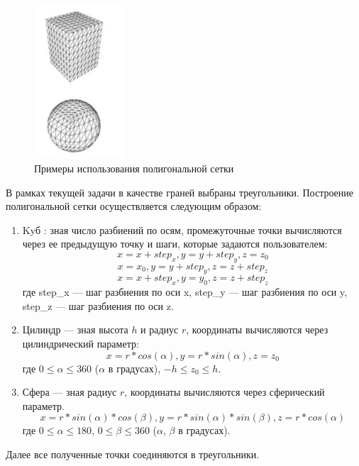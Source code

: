 \begin{figure}[h]
	\centering
	\includegraphics[width=0.3\textwidth]{img/polygon.png}
	\caption{Примеры использования полигональной сетки}
	\label{fig:polygon}
\end{figure}
\clearpage
В рамках текущей задачи в качестве граней выбраны треугольники.
Построение полигональной сетки осуществляется следующим образом:
\begin{enumerate}
	\item Kyб : зная число разбиений по осям, промежуточные точки вычисляются через ее предыдущую точку и шаги, которые задаются пользователем:
	\begin{equation}
		x = x + step_x, y = y + step_y, z = z_0
	\end{equation}
	\begin{equation}
		x = x_0, y = y + step_y, z = z + step_z
	\end{equation}
	\begin{equation}
		x = x + step_x, y = y_0, z = z + step_z
	\end{equation}
	где step\_x --- шаг разбиения по оси x, step\_y --- шаг разбиения по оси y, step\_z --- шаг разбиения по оси z.
	\item Цилиндр --- зная высота ${h}$ и радиус ${r}$, координаты вычисляются через цилиндрический параметр:
	\begin{equation}
		x = r * cos(\alpha), y = r * sin(\alpha), z = z_0
	\end{equation}
	где $0 \leqslant \alpha \leqslant 360$ ($\alpha$ в градусах), $-h \leqslant z_0 \leqslant h$.
	
	\item Сфера --- зная радиус ${r}$, координаты вычисляются через сферический параметр.
	\begin{equation}
		x = r * sin(\alpha) * cos(\beta), y = r * sin(\alpha) * sin(\beta), z = r * cos(\alpha)
	\end{equation}
	где $0 \leqslant \alpha \leqslant 180$, $0 \leqslant \beta \leqslant 360$ ($\alpha$, $\beta$ в градусах).
\end{enumerate}
Далее все полученные точки соединяются в треугольники.
